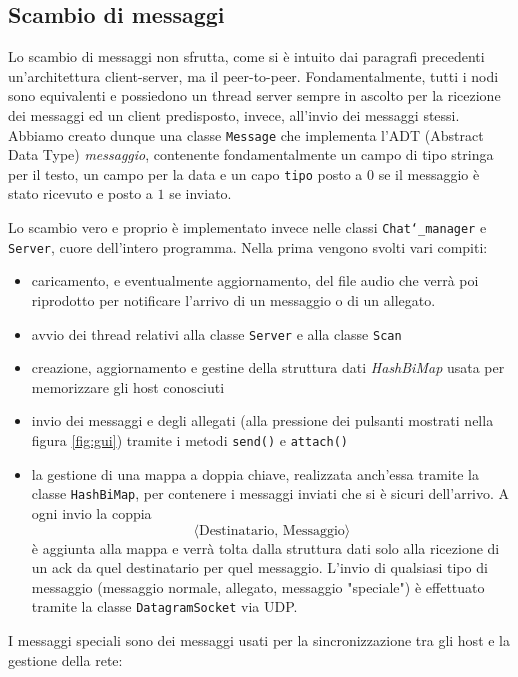 \subsection{Scambio di messaggi}
Lo scambio di messaggi non sfrutta, come si è intuito dai paragrafi precedenti un'architettura
client-server, ma il peer-to-peer. Fondamentalmente, tutti i nodi sono equivalenti e possiedono
un thread server sempre in ascolto per la ricezione dei messaggi ed un client predisposto, invece, all'invio
dei messaggi stessi. Abbiamo creato dunque una classe \texttt{Message} che implementa l'ADT (Abstract Data Type)
\textit{messaggio}, contenente fondamentalmente un campo di tipo stringa per il testo, un campo
per la data e un capo \texttt{tipo} posto a $0$ se il messaggio è stato ricevuto e posto a $1$ se inviato.

Lo scambio vero e proprio è implementato invece nelle classi \texttt{Chat\char`_manager} e \texttt{Server},
cuore dell'intero programma. Nella prima vengono svolti vari compiti:
\begin{itemize}
	\item caricamento, e eventualmente aggiornamento, del file audio che verrà poi riprodotto per notificare 
	l'arrivo di un messaggio o di un allegato.
	\item avvio dei thread relativi alla classe \texttt{Server} e alla classe \texttt{Scan}
	\item creazione, aggiornamento e gestine della struttura dati \emph{HashBiMap} usata per memorizzare gli host
	conosciuti
	\item invio dei messaggi e degli allegati (alla pressione dei pulsanti mostrati nella figura \ref{fig:gui})
	tramite i metodi \texttt{send()} e \texttt{attach()}
	\item la gestione di una mappa a doppia chiave, realizzata anch'essa tramite la classe \texttt{HashBiMap},
	per contenere i messaggi inviati che si è sicuri dell'arrivo. A ogni invio la coppia 
	$$ \langle \text{Destinatario, Messaggio} \rangle$$
	è aggiunta alla mappa e verrà tolta dalla struttura dati solo alla ricezione di un ack da quel destinatario
	per quel messaggio. L'invio di qualsiasi tipo di messaggio (messaggio normale, allegato, messaggio "speciale")
	è effettuato tramite la classe \texttt{DatagramSocket} via UDP.
\end{itemize}
I messaggi speciali sono dei messaggi usati per la sincronizzazione tra gli host e la gestione della rete:
